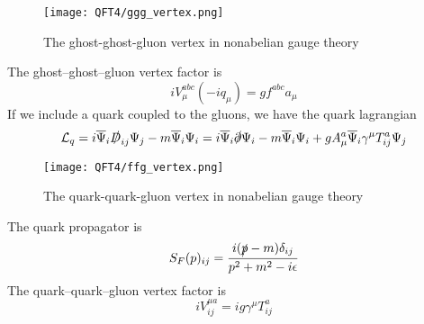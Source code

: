 \documentclass[cyan]{elegantnote}
\begin{document}
\begin{figure}[!h]
	\centering
	\texttt{[image: QFT4/ggg\_vertex.png]}
	\caption{The ghost-ghost-gluon vertex in nonabelian gauge theory}
\end{figure}

\noindent
The ghost–ghost–gluon vertex factor is
\[iV^{abc}_{\mu}(-iq_{\mu}) = gf^{abc}a_{\mu}\]
If we include a quark coupled to the gluons, we have the quark lagrangian
\[\mathcal{L}_{q} = i\overline{\Psi}_{i}\slashed{D}_{ij}\Psi_{j} - m\overline{\Psi}_{i}\Psi_{i} = i\overline{\Psi}_{i}\slashed{\partial}\Psi_{i} - m\overline{\Psi}_{i}\Psi_{i} + gA^a_{\mu}\overline{\Psi}_{i} \gamma^{\mu} T^a_{ij} \Psi_j \]

\begin{figure}[!h]
	\centering
	\texttt{[image: QFT4/ffg\_vertex.png]}
	\caption{The quark-quark-gluon vertex in nonabelian gauge theory}
\end{figure}

\noindent
The quark propagator is
\[S_F(p)_{ij} = \frac{i(\slashed{p}-m)\delta_{ij}}{p^2+m^2 - i\epsilon}\]
The quark–quark–gluon vertex factor is
\[iV^{\mu a}_{ij} =  ig\gamma^{\mu}T^a_{ij}\]
\end{document}
